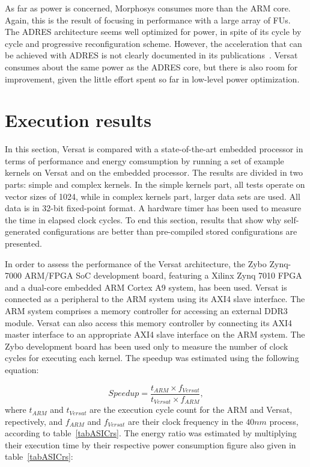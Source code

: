 As far as power is concerned, Morphosys consumes more than the ARM
core. Again, this is the result of focusing in performance with a
large array of FUs. The ADRES architecture seems well optimized for
power, in spite of its cycle by cycle and progressive reconfiguration
scheme. However, the acceleration that can be achieved with ADRES is
not clearly documented in its publications~\cite{Mei05}. Versat
consumes about the same power as the ADRES core, but there is also
room for improvement, given the little effort spent so far in
low-level power optimization.

\section{Execution results}
\label{section:executionResults}

In this section, Versat is compared with a state-of-the-art embedded
processor in terms of performance and energy comsumption by running a
set of example kernels on Versat and on the embedded processor. The
results are divided in two parts: simple and complex kernels. In the
simple kernels part, all tests operate on vector sizes of 1024, while
in complex kernels part, larger data sets are used. All data is in
32-bit fixed-point format. A hardware timer has been used to measure
the time in elapsed clock cycles. To end this section, results that
show why self-generated configurations are better than pre-compiled
stored configurations are presented.

In order to assess the performance of the Versat architecture, the
Zybo Zynq-7000 ARM/FPGA SoC development board, featuring a Xilinx Zynq
7010 FPGA and a dual-core embedded ARM Cortex A9 system, has been
used. Versat is connected as a peripheral to the ARM system using its
AXI4 slave interface. The ARM system comprises a memory controller for
accessing an external DDR3 module. Versat can also access this memory
controller by connecting its AXI4 master interface to an appropriate
AXI4 slave interface on the ARM system. The Zybo development board has
been used only to measure the number of clock cycles for executing
each kernel. The speedup was estimated using the following equation:

\begin{equation}
Speedup = \frac{t_{ARM}\times f_{Versat}}{t_{Versat}\times f_{ARM}},
\label{eq:speedup}
\end{equation}
where $t_{ARM}$ and $t_{Versat}$ are the execution cycle count for the
ARM and Versat, repectively, and $f_{ARM}$ and $f_{Versat}$ are their
clock frequency in the $40nm$ process, according to
table~\ref{tabASICrs}. The energy ratio was estimated by multiplying
their execution time by their respective power consumption figure also
given in table~\ref{tabASICrs}:

